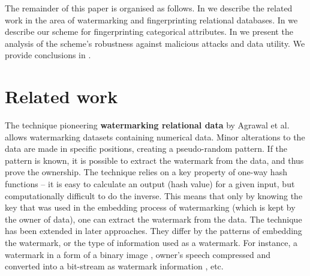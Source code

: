 \documentclass[runningheads]{llncs}
\begin{document}
The remainder of this paper is organised as follows. In  we describe the related work in the area of watermarking and fingerprinting relational databases.
In  we describe our scheme for fingerprinting categorical attributes. In  we present the analysis of the scheme's robustness against malicious attacks and data utility. We provide conclusions in .

\section{Related work}\label{sec:related-work}

The technique pioneering \textbf{watermarking relational data} by Agrawal et al. \cite{agrawal2003watermarking} allows watermarking datasets containing numerical data.
Minor alterations to the data are made in specific positions, creating a pseudo-random pattern. If the pattern is known, it is possible to extract the watermark from the data, and thus prove the ownership.
The technique relies on a key property of one-way hash functions -- it is easy to calculate an output (hash value) for a given input, but computationally difficult to do the inverse.
This means that only by knowing the key that was used in the embedding process of watermarking (which is kept by the owner of data), one can extract the watermark from the data.
The technique has been extended in later approaches. They differ by the patterns of embedding the watermark, or the type of information used as a watermark.
For instance, a watermark in a form of a binary image \cite{wang2008atbam}, owner’s speech compressed and converted into a bit-stream as watermark information \cite{wang2008speech}, etc.
\end{document}
